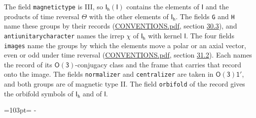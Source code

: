 \documentclass[10pt,a4paper]{article}
\newcommand{\needspace}[1]{\par\penalty-100\begingroup\dimen0=#1\relax\dimen2=\pagegoal
  \advance\dimen2-\pagetotal\ifdim\dimen0>\dimen2\relax\ifdim\dimen2>0pt\vfil\break\fi\fi
  \endgroup}
\numberwithin{equation}{section}
\newcommand{\grp}[1]{\mathsf{#1}}
\begin{document}
The field \texttt{magnetictype} is III, so $\grp{I_{h}}(\grp{I})$ contains the elements of $\grp{I}$ and the products of time reversal $\varTheta$ with the other elements of $\grp{I_{h}}$. The fields \texttt{G} and \texttt{H} name these groups by their records (\href{../../CONVENTIONS.pdf}{CONVENTIONS.pdf}, section \href{../../CONVENTIONS.pdf\#conv.30.3}{30.3}), and \texttt{antiunitarycharacter} names the irrep $\chi$ of $\grp{I_{h}}$ with kernel $\grp{I}$. The four fields \texttt{images} name the groups by which the elements move a polar or an axial vector, even or odd under time reversal (\href{../../CONVENTIONS.pdf}{CONVENTIONS.pdf}, section \href{../../CONVENTIONS.pdf\#conv.31.2}{31.2}). Each names the record of its $\grp{O(3)}$-conjugacy class and the frame that carries that record onto the image. The fields \texttt{normalizer} and \texttt{centralizer} are taken in $\grp{O(3)1'}$, and both groups are of magnetic type II. The field \texttt{orbifold} of the record gives the orbifold symbols of $\grp{I_{h}}$ and of $\grp{I}$.
\needspace{103pt}
\end{document}
